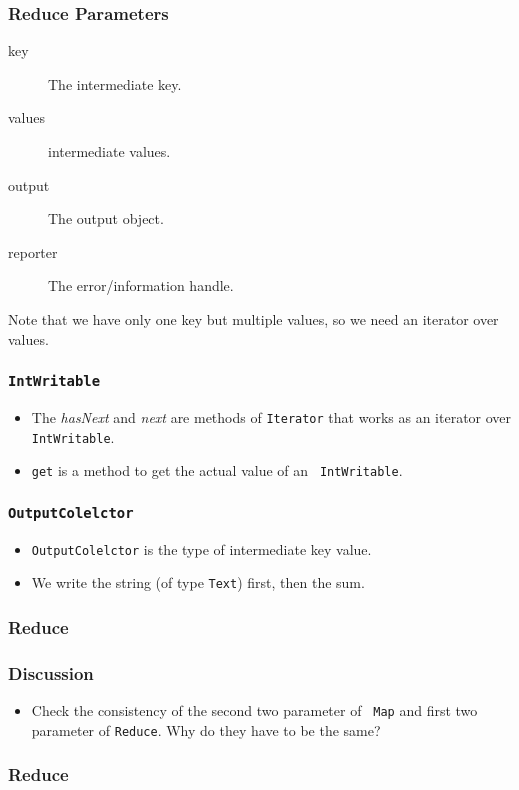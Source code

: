 \documentclass{beamer}
\begin{document}
\begin{frame}
  \frametitle{Reduce Parameters}  \begin{description}
    \item[key] The intermediate key.
    \item[values] intermediate values.
    \item[output] The output object.
    \item[reporter] The error/information handle.
  \end{description}
  Note that we have only one key but multiple values, so we need an
  iterator over values.
\end{frame}

\begin{frame}
  \frametitle{\tt IntWritable}
  \begin{itemize}
  \item The {\em hasNext} and {\em next} are methods of {\tt Iterator}
    that works as an iterator over {\tt IntWritable}.
  \item {\tt get} is a method to get the actual value of an {\tt
    IntWritable}.
  \end{itemize}
\end{frame}

\begin{frame}
  \frametitle{\tt OutputColelctor}
  \begin{itemize}
  \item {\tt OutputColelctor} is the type of intermediate key value.
  \item We write the string (of type {\tt Text}) first, then the sum.
  \end{itemize}
\end{frame}

\begin{frame}
  \frametitle{Reduce}
\end{frame}

\begin{frame}
  \frametitle{Discussion}
  \begin{itemize}
    \item Check the consistency of the second two parameter of {\tt
      Map} and first two parameter of {\tt Reduce}.  Why do they have
      to be the same?
  \end{itemize}
\end{frame}

\begin{frame}
  \frametitle{Reduce}
\end{frame}
\end{document}
